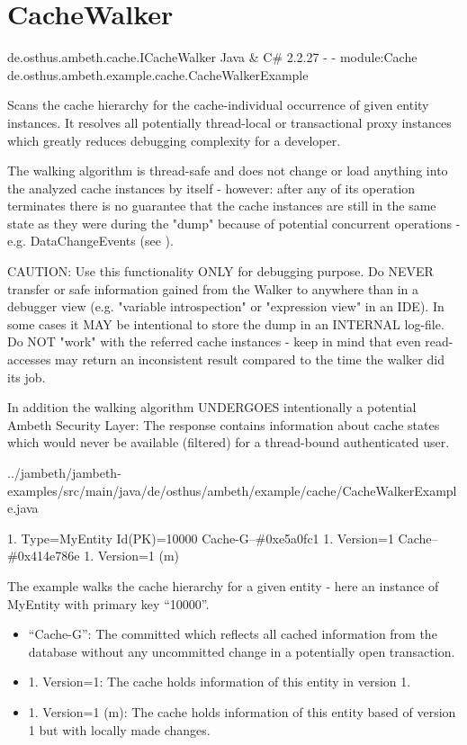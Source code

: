 \section{CacheWalker}
\label{feature:CacheWalker}

\feature
	{de.osthus.ambeth.cache.ICacheWalker}
	{Java \& C\#}
	{2.2.27}
	{-}
	{-}
	{module:Cache}
	{de.osthus.ambeth.example.cache.CacheWalkerExample}

Scans the cache hierarchy for the cache-individual occurrence of given entity instances. It resolves all potentially thread-local or transactional proxy instances which greatly reduces debugging complexity for a developer.\newline

The walking algorithm is thread-safe and does not change or load anything into the analyzed cache instances by itself - however: after any of its operation terminates there is no guarantee that the cache instances are still in the same state as they were during the "dump" because of potential concurrent operations - e.g. DataChangeEvents (see ).\newline

CAUTION: Use this functionality ONLY for debugging purpose. Do NEVER transfer or safe information gained from the Walker to anywhere than in a debugger view (e.g. "variable introspection" or "expression view" in an IDE). In some cases it MAY be intentional to store the dump in an INTERNAL log-file. Do NOT "work" with the referred cache instances - keep in mind that even read-accesses may return an inconsistent result compared to the time the walker did its job.\newline

In addition the walking algorithm UNDERGOES intentionally a potential Ambeth Security Layer: The response contains information about cache states which would never be available (filtered) for a thread-bound authenticated user.

	{../jambeth/jambeth-examples/src/main/java/de/osthus/ambeth/example/cache/CacheWalkerExample.java}

{
	1. Type=MyEntity Id(PK)=10000
	 Cache-G--\#0xe5a0fc1
		  1. Version=1
		 Cache--\#0x414e786e
			   1. Version=1 (m)
}

The example walks the cache hierarchy for a given entity - here an instance of MyEntity with primary key ``10000''.
\begin{itemize}
	\item ``Cache-G'': The committed  which reflects all cached information from the database without any uncommitted change in a potentially open transaction.
	\item 1. Version=1: The cache holds information of this entity in version 1.
	\item 1. Version=1 (m): The cache holds information of this entity based of version 1 but with locally made changes.
\end{itemize}

